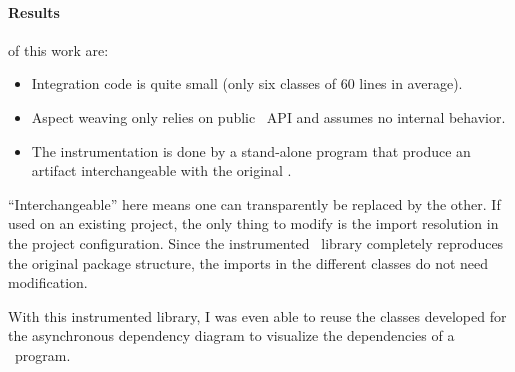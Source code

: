 \paragraph{Results} of this work are:
\begin{itemize}
\item Integration code is quite small (only six classes of 60 lines in average).
\item Aspect weaving only relies on public \vertx\ API and assumes no internal behavior.
\item The instrumentation is done by a stand-alone program that produce an artifact interchangeable with the original \vertx.
\end{itemize}

``Interchangeable'' here means one can transparently be replaced by the other. If used on an existing project, the only thing to modify is the import resolution in the project configuration. Since the instrumented \vertx\ library completely reproduces the original package structure, the imports in the different classes do not need modification.

With this instrumented library, I was even able to reuse the classes developed for the asynchronous dependency diagram to visualize the dependencies of a \vertx\ program.


